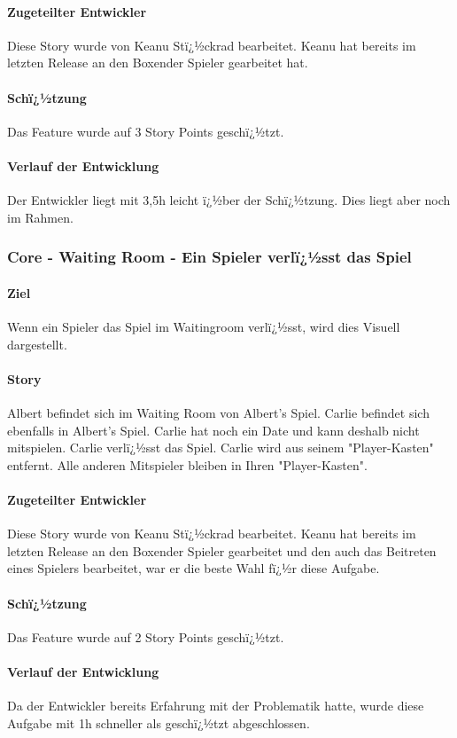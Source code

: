 \documentclass[12pt, titlepage]{scrartcl}
\begin{document}
			\paragraph{Zugeteilter Entwickler} Diese Story wurde von Keanu Stï¿½ckrad bearbeitet. Keanu hat bereits im letzten Release an den \glqq Boxen\grqq der Spieler gearbeitet hat.
			\paragraph{Schï¿½tzung}
			Das Feature wurde auf 3 Story Points geschï¿½tzt.
			\paragraph{Verlauf der Entwicklung} 
			Der Entwickler liegt mit 3,5h leicht ï¿½ber der Schï¿½tzung. Dies liegt aber noch im Rahmen.
			
			\subsubsection{Core - Waiting Room - Ein Spieler verlï¿½sst das Spiel}
			\paragraph{Ziel} Wenn ein Spieler das Spiel im Waitingroom verlï¿½sst, wird dies Visuell dargestellt.
			\paragraph{Story} Albert befindet sich im Waiting Room von Albert's Spiel. Carlie befindet sich ebenfalls in Albert's Spiel. Carlie hat noch ein Date und kann deshalb nicht mitspielen. Carlie verlï¿½sst das Spiel. Carlie wird aus seinem "Player-Kasten" entfernt. Alle anderen Mitspieler bleiben in Ihren "Player-Kasten".
			\paragraph{Zugeteilter Entwickler} Diese Story wurde von Keanu Stï¿½ckrad bearbeitet. Keanu hat bereits im letzten Release an den \glqq Boxen\grqq der Spieler gearbeitet und den auch das Beitreten eines Spielers bearbeitet, war er die beste Wahl fï¿½r diese Aufgabe.
			\paragraph{Schï¿½tzung}
			Das Feature wurde auf 2 Story Points geschï¿½tzt.
			\paragraph{Verlauf der Entwicklung} 
			Da der Entwickler bereits Erfahrung mit der Problematik hatte, wurde diese Aufgabe mit 1h schneller als geschï¿½tzt abgeschlossen.
			
\end{document}

